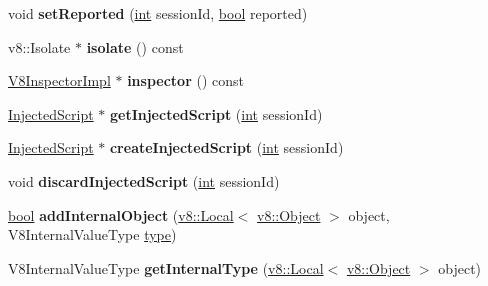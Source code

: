 \begin{DoxyCompactItemize}
void {\bfseries set\+Reported} (\mbox{\hyperlink{classint}{int}} session\+Id, \mbox{\hyperlink{classbool}{bool}} reported)
\item 
\mbox{\label{classv8__inspector_1_1InspectedContext_ae205a93281470ae5e7ccb68aba869f93}} 
v8\+::\+Isolate $\ast$ {\bfseries isolate} () const
\item 
\mbox{\label{classv8__inspector_1_1InspectedContext_a19f0b8c31e474dc9ad54ae13d9c755ec}} 
\mbox{\hyperlink{classv8__inspector_1_1V8InspectorImpl}{V8\+Inspector\+Impl}} $\ast$ {\bfseries inspector} () const
\item 
\mbox{\label{classv8__inspector_1_1InspectedContext_abe68fb99f6d03d0cc08acdf239217dd5}} 
\mbox{\hyperlink{classv8__inspector_1_1InjectedScript}{Injected\+Script}} $\ast$ {\bfseries get\+Injected\+Script} (\mbox{\hyperlink{classint}{int}} session\+Id)
\item 
\mbox{\label{classv8__inspector_1_1InspectedContext_afdc1898d764520c947e2610c77346fc5}} 
\mbox{\hyperlink{classv8__inspector_1_1InjectedScript}{Injected\+Script}} $\ast$ {\bfseries create\+Injected\+Script} (\mbox{\hyperlink{classint}{int}} session\+Id)
\item 
\mbox{\label{classv8__inspector_1_1InspectedContext_a13496891bfda00c2f88ea6536cd0e4c1}} 
void {\bfseries discard\+Injected\+Script} (\mbox{\hyperlink{classint}{int}} session\+Id)
\item 
\mbox{\label{classv8__inspector_1_1InspectedContext_ae3c7ed4492c85ecf6e9c59b6e191c25c}} 
\mbox{\hyperlink{classbool}{bool}} {\bfseries add\+Internal\+Object} (\mbox{\hyperlink{classv8_1_1Local}{v8\+::\+Local}}$<$ \mbox{\hyperlink{classv8_1_1Object}{v8\+::\+Object}} $>$ object, V8\+Internal\+Value\+Type \mbox{\hyperlink{classstd_1_1conditional_1_1type}{type}})
\item 
\mbox{\label{classv8__inspector_1_1InspectedContext_ac50a51ef3dd317948774e9ac45a56692}} 
V8\+Internal\+Value\+Type {\bfseries get\+Internal\+Type} (\mbox{\hyperlink{classv8_1_1Local}{v8\+::\+Local}}$<$ \mbox{\hyperlink{classv8_1_1Object}{v8\+::\+Object}} $>$ object)
\end{DoxyCompactItemize}
